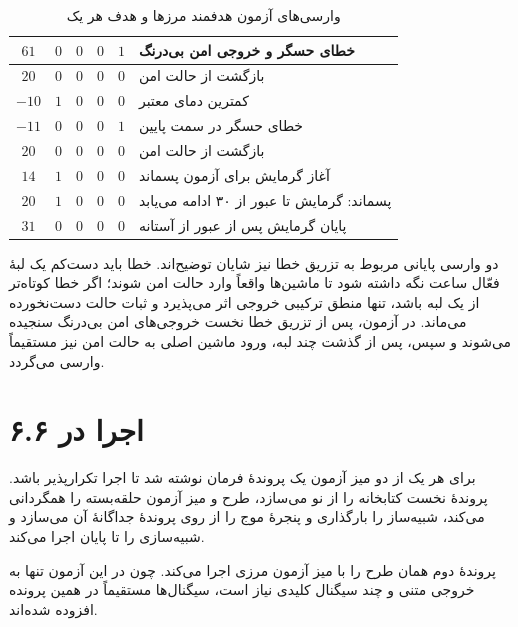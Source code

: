 \documentclass[12pt,a4paper]{article}
\begin{document}
\begin{table}[H]
\begin{tabular}{|c|c|c|c|c|l|}
			\(61\)  & \(0\) & \(0\) & \(0\) & \(1\) & خطای حسگر و خروجی امن بی‌درنگ \\ \hline
			\(20\)  & \(0\) & \(0\) & \(0\) & \(0\) & بازگشت از حالت امن \\ \hline
			\(-10\) & \(1\) & \(0\) & \(0\) & \(0\) & کمترین دمای معتبر \\ \hline
			\(-11\) & \(0\) & \(0\) & \(0\) & \(1\) & خطای حسگر در سمت پایین \\ \hline
			\(20\)  & \(0\) & \(0\) & \(0\) & \(0\) & بازگشت از حالت امن \\ \hline
			\(14\)  & \(1\) & \(0\) & \(0\) & \(0\) & آغاز گرمایش برای آزمون پسماند \\ \hline
			\(20\)  & \(1\) & \(0\) & \(0\) & \(0\) & پسماند: گرمایش تا عبور از ۳۰ ادامه می‌یابد \\ \hline
			\(31\)  & \(0\) & \(0\) & \(0\) & \(0\) & پایان گرمایش پس از عبور از آستانه \\ \hline
		\end{tabular}
		\caption{وارسی‌های آزمون هدفمند مرزها و هدف هر یک}
	\end{table}

	دو وارسی پایانی مربوط به تزریق خطا نیز شایان توضیح‌اند. خطا باید دست‌کم یک لبهٔ فعّال ساعت نگه داشته شود تا ماشین‌ها واقعاً وارد حالت امن شوند؛ اگر خطا کوتاه‌تر از یک لبه باشد، تنها منطق ترکیبی خروجی اثر می‌پذیرد و ثبات حالت دست‌نخورده می‌ماند. در آزمون، پس از تزریق خطا نخست خروجی‌های امن بی‌درنگ سنجیده می‌شوند و سپس، پس از گذشت چند لبه، ورود ماشین اصلی به حالت امن نیز مستقیماً وارسی می‌گردد.

	\section*{۶.۶ اجرا در }
	برای هر یک از دو میز آزمون یک پروندهٔ فرمان نوشته شد تا اجرا تکرارپذیر باشد. پروندهٔ نخست کتابخانه را از نو می‌سازد، طرح و میز آزمون حلقه‌بسته را همگردانی می‌کند، شبیه‌ساز را بارگذاری و پنجرهٔ موج را از روی پروندهٔ جداگانهٔ آن می‌سازد و شبیه‌سازی را تا پایان اجرا می‌کند.



	پروندهٔ دوم همان طرح را با میز آزمون مرزی اجرا می‌کند. چون در این آزمون تنها به خروجی متنی و چند سیگنال کلیدی نیاز است، سیگنال‌ها مستقیماً در همین پرونده افزوده شده‌اند.

\end{document}
